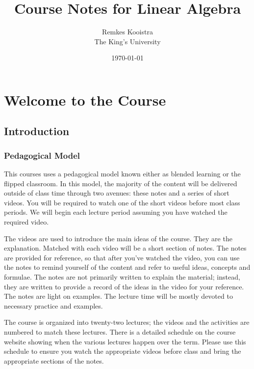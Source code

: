 \documentclass[fleqn]{report}
\begin{document}
\title{Course Notes for Linear Algebra}
\author{Remkes Kooistra \\
	The King's University}
\date{\today}
\maketitle

\setcounter{tocdepth}{1}
\tableofcontents
{}

\chapter{Welcome to the Course}
\label{welcome}

\section{Introduction}
\label{introduction}

\subsection{Pedagogical Model}
\label{model}

This courses uses a pedagogical model known either as blended
learning or the flipped classroom. In this model, the majority of the
content will be delivered outside of class time through
two avenues: these notes and a series of short videos.
You will be required to watch one of the short videos 
before most class periods. We will
begin each lecture period assuming you have watched the
required video.

The videos are used to introduce the main ideas of the
course. They are the explanation. Matched with each video 
will be a short section of notes. The
notes are provided for reference, so that after you've watched
the video, you can use the notes to remind yourself of the
content and refer to useful ideas, concepts and formulae. The
notes are not primarily written to explain the material;
instead, they are written to provide a record of the ideas in
the video for your reference. The notes are light on
examples. The lecture time will be mostly devoted to
necessary practice and examples.

The course is organized into twenty-two lectures; the videos
and the activities are numbered to match these lectures. There
is a detailed schedule on the course website showing when the
various lectures happen over the term. Please use this
schedule to ensure you watch the appropriate videos before
class and bring the appropriate sections of the notes. 
\end{document}
